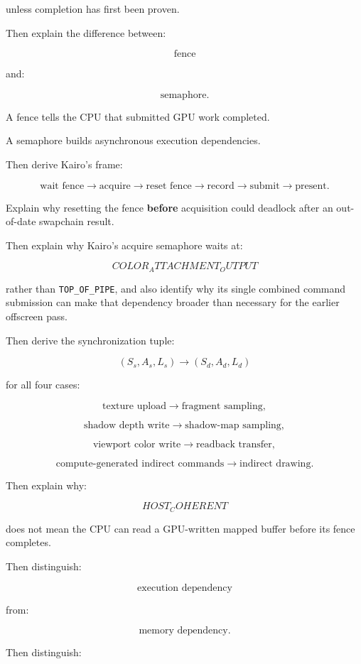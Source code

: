 unless completion has first been proven.

Then explain the difference between:

\[
\boxed{\text{fence}}
\]

and:

\[
\boxed{\text{semaphore}}.
\]

A fence tells the CPU that submitted GPU work completed.

A semaphore builds asynchronous execution dependencies.

Then derive Kairo's frame:

\[
\text{wait fence}
\rightarrow
\text{acquire}
\rightarrow
\text{reset fence}
\rightarrow
\text{record}
\rightarrow
\text{submit}
\rightarrow
\text{present}.
\]

Explain why resetting the fence \textbf{before} acquisition could deadlock after an out-of-date swapchain result.

Then explain why Kairo's acquire semaphore waits at:

\[
COLOR_ATTACHMENT_OUTPUT
\]

rather than \texttt{TOP\_OF\_PIPE}, and also identify why its single combined command submission can make that dependency broader than necessary for the earlier offscreen pass.

Then derive the synchronization tuple:

\[
\boxed{
(S_s,A_s,L_s)
\rightarrow
(S_d,A_d,L_d)
}
\]

for all four cases:

\[
\text{texture upload}
\rightarrow
\text{fragment sampling},
\]

\[
\text{shadow depth write}
\rightarrow
\text{shadow-map sampling},
\]

\[
\text{viewport color write}
\rightarrow
\text{readback transfer},
\]

\[
\text{compute-generated indirect commands}
\rightarrow
\text{indirect drawing}.
\]

Then explain why:

\[
HOST_COHERENT
\]

does not mean the CPU can read a GPU-written mapped buffer before its fence completes.

Then distinguish:

\[
\text{execution dependency}
\]

from:

\[
\text{memory dependency}.
\]

Then distinguish:

